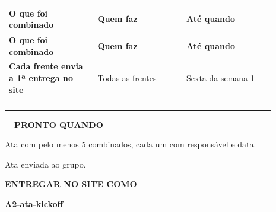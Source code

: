 \documentclass[11pt,a4paper]{article}
\begin{document}
\begin{longtable}{>{\raggedright\arraybackslash}p{0.297\linewidth}>{\raggedright\arraybackslash}p{0.297\linewidth}>{\raggedright\arraybackslash}p{0.297\linewidth}}
\rowcolor{cor} \color{white}\textbf{\footnotesize O que foi combinado} & \color{white}\textbf{\footnotesize Quem faz} & \color{white}\textbf{\footnotesize Até quando} \\
\endfirsthead
\rowcolor{cor} \color{white}\textbf{\footnotesize O que foi combinado} & \color{white}\textbf{\footnotesize Quem faz} & \color{white}\textbf{\footnotesize Até quando} \\
\endhead
\rowcolor{white}\textbf{Cada frente envia a 1ª entrega no site} & Todas as frentes & Sexta da semana 1 \\ \hline
\rowcolor{suave!55}\rule{0pt}{24pt} &  &  \\ \hline
\rowcolor{white}\rule{0pt}{24pt} &  &  \\ \hline
\rowcolor{suave!55}\rule{0pt}{24pt} &  &  \\ \hline
\rowcolor{white}\rule{0pt}{24pt} &  &  \\ \hline
\end{longtable}
\endgroup
\begin{lrbox}{\blocofinal}\begin{minipage}{\linewidth}
\begin{tcolorbox}[enhanced,colback=suave!45,colframe=cor!35,boxrule=0.8pt,arc=8pt,left=10pt,right=10pt,top=8pt,bottom=8pt,before skip=0pt,after skip=0pt]
\begin{minipage}[t]{0.56\linewidth}\vspace{0pt}
{\footnotesize\bfseries\color{cor}\faCheckDouble\ \ PRONTO QUANDO}\par\vspace{2pt}
\begin{checklist}
  \item Ata com pelo menos 5 combinados, cada um com responsável e data.
  \item Ata enviada ao grupo.
\end{checklist}
\end{minipage}\hfill
\begin{minipage}[t]{0.40\linewidth}\vspace{0pt}
\begin{selo}\centering
{\LARGE\color{cor}\faUpload}\par\vspace{3pt}
{\scriptsize\bfseries\color{cor}ENTREGAR NO SITE COMO}\par\vspace{2pt}
{\bfseries A2-ata-kickoff}
\end{selo}
\end{minipage}
\end{tcolorbox}
\end{minipage}\end{lrbox}
\end{document}
